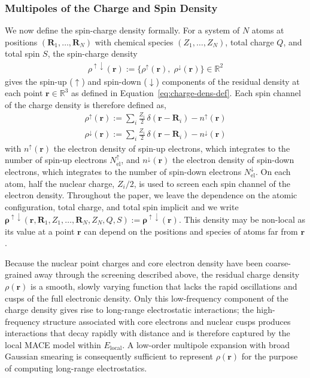 \documentclass[aps,%
superscriptaddress,
 amsmath,amssymb,
floatfix,
twocolumn
]{revtex4-2}
\begin{document}
\subsubsection{Multipoles of the Charge and Spin Density}
We now define the spin-charge density formally. For a system
of $N$ atoms at positions $(\mathbf{R}_1, \ldots, \mathbf{R}_N)$
with chemical species $(Z_1, \ldots, Z_N)$, total charge $Q$, and
total spin $S$, the spin-charge density
%
\begin{align}
    \rho^{\uparrow \downarrow}(\mathbf{r})
    := \{\rho^{\uparrow}(\mathbf{r}),\;
    \rho^{\downarrow}(\mathbf{r})\} \in \mathbb{R}^2
\end{align}
gives the spin-up ($\uparrow$) and spin-down ($\downarrow$)
components of the residual density at each point
$\mathbf{r} \in \mathbb{R}^3$ as defined in Equation~\ref{eq:charge-dens-def}.
Each spin channel of the charge density is therefore defined as,
%
\begin{align}
    \rho^{\uparrow}(\mathbf{r})
    := \sum_i \frac{Z_i}{2}\,\delta(\mathbf{r} - \mathbf{R}_i)
  - n^{\uparrow}(\mathbf{r}) \\
  \rho^{\downarrow}(\mathbf{r})
    := \sum_i \frac{Z_i}{2}\,\delta(\mathbf{r} - \mathbf{R}_i)
  - n^{\downarrow}(\mathbf{r})
\end{align}
% 
with $n^{\uparrow}(\mathbf{r})$ the electron density of spin-up electrons, which integrates to the number of spin-up electrons $N_{\text{el}}^{\uparrow}$, and $n^{\downarrow}(\mathbf{r})$ the electron density of spin-down electrons, which integrates to the number of spin-down electrons $N_{\text{el}}^{\downarrow}$. On each atom, half the nuclear charge, $Z_i/2$, is used to screen each spin channel of the electron density.
Throughout the paper, we leave the dependence
on the atomic configuration, total charge, and total spin implicit and we write $\mathbf{\rho^{\uparrow \downarrow}}(\mathbf{r}, \mathbf{R}_1, Z_{1}, \ldots, \mathbf{R}_N, Z_{N}, Q, S):=\mathbf{\rho^{\uparrow \downarrow}}(\mathbf{r})$. This density may be non-local as its
value at a point $\mathbf{r}$ can depend on the positions and species of
atoms far from $\mathbf{r}$.

Because the nuclear point charges and core electron density have 
been coarse-grained away through the screening described above, 
the residual charge density $\rho(\mathbf{r})$ is a smooth, slowly 
varying function that lacks the rapid oscillations and cusps of the 
full electronic density. Only this low-frequency component of the 
charge density gives rise to long-range electrostatic interactions; 
the high-frequency structure associated with core electrons and 
nuclear cusps produces interactions that decay rapidly with distance 
and is therefore captured by the local MACE model within 
$E_{\text{local}}$. A low-order multipole expansion with broad 
Gaussian smearing is consequently sufficient to represent $\rho(\mathbf{r})$ for the purpose of computing 
long-range electrostatics.
\end{document}
